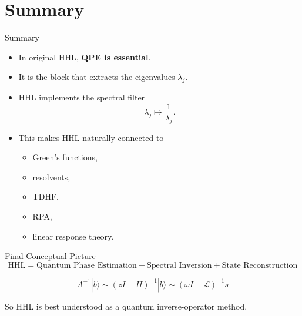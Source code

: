 \documentclass{beamer}
\begin{document}
\section{Summary}

\begin{frame}{Summary}
\begin{itemize}
\item In original HHL, \textbf{QPE is essential}.
\item It is the block that extracts the eigenvalues \(\lambda_j\).
\item HHL implements the spectral filter
\[
\lambda_j \mapsto \frac{1}{\lambda_j}.
\]
\item This makes HHL naturally connected to
\begin{itemize}
\item Green's functions,
\item resolvents,
\item TDHF,
\item RPA,
\item linear response theory.
\end{itemize}
\end{itemize}
\end{frame}


\begin{frame}{Final Conceptual Picture}
\[
\boxed{
\text{HHL}
=
\text{Quantum Phase Estimation}
+
\text{Spectral Inversion}
+
\text{State Reconstruction}
}
\]

\[
\boxed{
A^{-1}|b\rangle
\sim
(zI-H)^{-1}|b\rangle
\sim
(\omega I-\mathcal{L})^{-1} s
}
\]

So HHL is best understood as a quantum inverse-operator method.
\end{frame}
\end{document}
